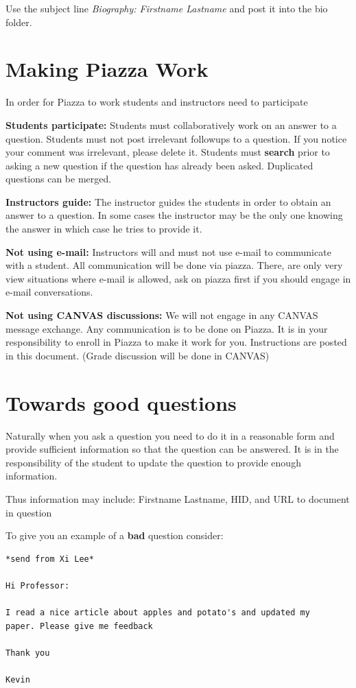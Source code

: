Use the subject line \emph{Biography: Firstname Lastname} and post it
into the bio folder.

\section{Making Piazza Work}

In order for Piazza to work students and instructors need to participate

\textbf{Students participate:} Students must collaboratively work on an
answer to a question. Students must not post irrelevant followups to a
question. If you notice your comment was irrelevant, please delete it.
Students must \textbf{search} prior to asking a new question if the
question has already been asked. Duplicated questions can be merged.

\textbf{Instructors guide:} The instructor guides the students in order
to obtain an answer to a question. In some cases the instructor may be
the only one knowing the answer in which case he tries to provide it.

\textbf{Not using e-mail:} Instructors will and must not use e-mail to
communicate with a student. All communication will be done via piazza.
There, are only very view situations where e-mail is allowed, ask on
piazza first if you should engage in e-mail conversations.

\textbf{Not using CANVAS discussions:} We will not engage in any CANVAS
message exchange. Any communication is to be done on Piazza. It is in
your responsibility to enroll in Piazza to make it work for you.
Instructions are posted in this document. (Grade discussion will be
done in CANVAS)

\section{Towards good questions}

Naturally when you ask a question you need to do it in a reasonable form
and provide sufficient information so that the question can be answered.
It is in the responsibility of the student to update the question to
provide enough information.

Thus information may include: Firstname Lastname, HID, and URL
to document in question

To give you an example of a \textbf{bad} question consider:

\begin{verbatim}
*send from Xi Lee*

Hi Professor:

I read a nice article about apples and potato's and updated my
paper. Please give me feedback

Thank you

Kevin
\end{verbatim}

